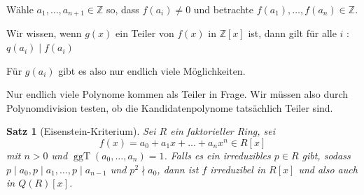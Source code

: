 \documentclass[a4paper,12pt,numbers=noenddot,parskip=full]{scrartcl}
\newcommand{\setZ}{\mathbb{Z}}
\theoremstyle{dotless}
\newtheorem{theorem}{Satz}[section]
\theoremstyle{remark}
\begin{document}
	Wähle $a_1, \dots, a_{n+1} \in \setZ$ so, dass $f(a_i) \neq 0$ und betrachte $f(a_1), \dots, f(a_n) \in \setZ$.
	
	Wir wissen, wenn $g(x)$ ein Teiler von $f(x)$ in $\setZ[x]$ ist, dann gilt für alle $i$ : $q(a_i) \mid f(a_i)$
	
	Für $g(a_i)$ gibt es also nur endlich viele Möglichkeiten.
	
	Nur endlich viele Polynome kommen als Teiler in Frage. Wir müssen also durch Polynomdivision testen, ob die Kandidatenpolynome tatsächlich Teiler sind.
	
	\begin{theorem}[Eisenstein-Kriterium]
		Sei $R$ ein faktorieller Ring, sei\begin{equation*}
			f(x) = a_0 + a_1 x + \dots + a_n x^n \in R[x]
		\end{equation*}
		mit $n > 0$ und $\operatorname{ggT}(a_0, \dots, a_n) = 1$. Falls es ein irreduzibles $p \in R$ gibt, sodass $p \mid a_0, p \mid a_1, \dots, p \mid a_{n-1}$ und $p^2 \nmid a_0$, dann ist $f$ irreduzibel in $R[x]$ und also auch in $Q(R)[x]$.
	\end{theorem}
\end{document}
